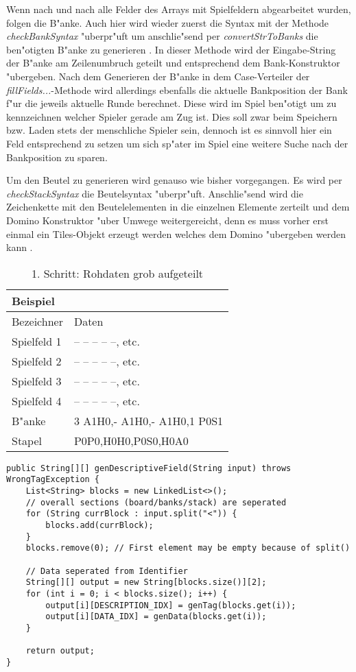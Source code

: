 Wenn nach und nach alle Felder des Arrays mit Spielfeldern abgearbeitet wurden, folgen die B"anke. Auch hier wird wieder zuerst die Syntax mit der Methode \emph{checkBankSyntax} "uberpr"uft um anschlie"send per \emph{convertStrToBanks} die ben"otigten B"anke zu generieren . In dieser Methode wird der Eingabe-String der B"anke am Zeilenumbruch geteilt und entsprechend dem Bank-Konstruktor "ubergeben. Nach dem Generieren der B"anke in dem Case-Verteiler der \emph{fillFields...}-Methode wird allerdings ebenfalls die aktuelle Bankposition der Bank f"ur die jeweils aktuelle Runde berechnet. Diese wird im Spiel ben"otigt um zu kennzeichnen welcher Spieler gerade am Zug ist. Dies soll zwar beim Speichern bzw. Laden stets der menschliche Spieler sein, dennoch ist es sinnvoll hier ein Feld entsprechend zu setzen um sich sp"ater im Spiel eine weitere Suche nach der Bankposition zu sparen. 

Um den Beutel zu generieren wird genauso wie bisher vorgegangen. Es wird per \emph{checkStackSyntax} die Beutelsyntax "uberpr"uft. Anschlie"send wird die Zeichenkette mit den Beutelelementen in die einzelnen Elemente zerteilt und dem Domino Konstruktor "uber Umwege weitergereicht, denn es muss vorher erst einmal ein Tiles-Objekt erzeugt werden welches dem Domino "ubergeben werden kann . 

\begin{table}
\centering
\begin{tabular}{ll}
\toprule
Beispiel\\
\midrule
Bezeichner & Daten\\
\midrule
Spielfeld 1 & -- -- -- -- --, etc.\\
Spielfeld 2 & -- -- -- -- --, etc.\\
Spielfeld 3 & -- -- -- -- --, etc.\\
Spielfeld 4 & -- -- -- -- --, etc.\\
B"anke & 3 A1H0,- A1H0,- A1H0,1 P0S1\\
Stapel & P0P0,H0H0,P0S0,H0A0\\
\bottomrule
\end{tabular}
\caption{1. Schritt: Rohdaten grob aufgeteilt}
\label{tab:bspRochdaten}
\end{table}
 
\begin{lstlisting}[style=CodeHighlighting,float,caption=Converter - genDescriptiveField,label=lst:converter_genDescriptiveField]
public String[][] genDescriptiveField(String input) throws WrongTagException {
    List<String> blocks = new LinkedList<>();
    // overall sections (board/banks/stack) are seperated
    for (String currBlock : input.split("<")) {
        blocks.add(currBlock);
    }
    blocks.remove(0); // First element may be empty because of split()

    // Data seperated from Identifier
    String[][] output = new String[blocks.size()][2];
    for (int i = 0; i < blocks.size(); i++) {
        output[i][DESCRIPTION_IDX] = genTag(blocks.get(i));
        output[i][DATA_IDX] = genData(blocks.get(i));
    }

    return output;
}
\end{lstlisting}

